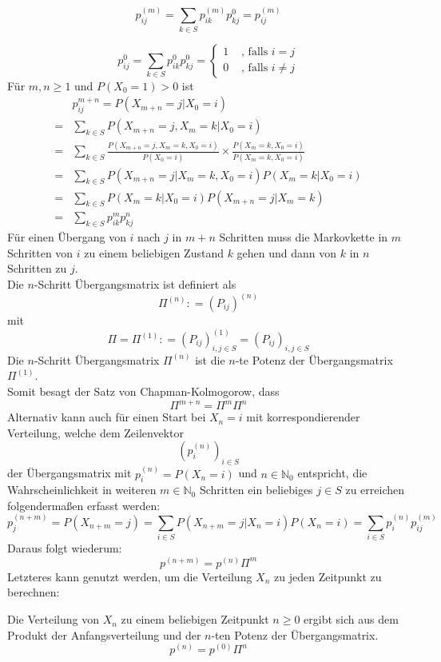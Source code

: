 \documentclass[a4paper,12pt]{article}
\begin{document}
$$
p_{ij}^{(m)} = \sum_{k \in S} p_{ik}^{(m)}p_{kj}^{0} = p_{ij}^{(m)}
$$

$$
p_{ij}^{0} = \sum_{k \in S} p_{ik}^{0}p_{kj}^{0} = \begin{cases}
	1 & \text{ , falls } i = j\\
	0 &\text{ , falls } i \neq j \end{cases}
$$
Für $m,n \geq 1$ und $P(X_0 = 1) > 0$ ist
\begin{align*}
& p_{ij}^{m+n} = P(X_{m+n} = j | X_0 = i) \\
=& \sum_{k \in S} P(X_{m+n} = j, X_m = k | X_0 = i) \\
=& \sum_{k \in S} \frac{P(X_{m+n} = j, X_m = k , X_0 = i)}{P(X_0 = i)} \times \frac{P(X_m = k, X_0 = i)}{P(X_m = k, X_0 = i)}\\
=& \sum_{k \in S} P(X_{m+n}=j | X_m = k, X_0 = i)P(X_m = k|X_0 = i) \\
=& \sum_{k \in S}P(X_m = k | X_0 = i)P(X_{m+n} = j |X_m = k) \\
=& \sum_{k \in S}p_{ik}^{m}p_{kj}^{n}
\end{align*}
Für einen Übergang von $i$ nach $j$ in $m+n$ Schritten muss die Markovkette in $m$ Schritten von $i$ zu einem beliebigen Zustand $k$ gehen und dann von $k$ in $n$ Schritten zu $j$.\\
Die $n$-Schritt Übergangsmatrix ist definiert als 
$$
\Pi^{(n)}: = (P_{ij})^{(n)}
$$
mit 
$$
\Pi = \Pi^{(1)}: = (P_{ij})^{(1)}_{i,j \in S} = (P_{ij})_{i,j \in S}
$$
Die $n$-Schritt Übergangsmatrix $\Pi^{(n)}$ ist die $n$-te Potenz der Übergangsmatrix $\Pi^{(1)}$.\\
Somit besagt der Satz von Chapman-Kolmogorow, dass
$$
\Pi^{m+n} = \Pi^{m}\Pi^{n}
$$
Alternativ kann auch für einen Start bei $X_n = i$ mit korrespondierender Verteilung, welche dem
Zeilenvektor
$$
(p_i^{(n)})_{i \in S}
$$
der Übergangsmatrix mit $p_i^{(n)} = P(X_n = i)$ und $n \in \mathbb{N}_0$ entspricht,
die Wahrscheinlichkeit in weiteren $m \in \mathbb{N}_0$ Schritten ein beliebiges $j \in S$ zu erreichen folgendermaßen
erfasst werden: 
$$
p_{j}^{(n+m)} = P(X_{n+m}=j) = \sum_{i \in S}P(X_{n+m} = j | X_n = i)P(X_n = i) = \sum_{i \in S}p_i^{(n)}p_{ij}^{(m)}
$$
Daraus folgt wiederum:
$$
p^{(n+m)} = p^{(n)} \Pi^m 
$$
Letzteres kann genutzt werden, um die Verteilung $X_n$ zu jeden Zeitpunkt zu berechnen:

\begin{tcolorbox}[breakable, colframe=green, colback=white, title=Satz 9]
Die Verteilung von $X_n$ zu einem beliebigen Zeitpunkt $n \geq 0$ ergibt sich aus dem Produkt der Anfangsverteilung
und der $n$-ten Potenz der Übergangsmatrix.
$$
p^{(n)} = p^{(0)} \Pi^n
$$
\end{tcolorbox}
\end{document}
